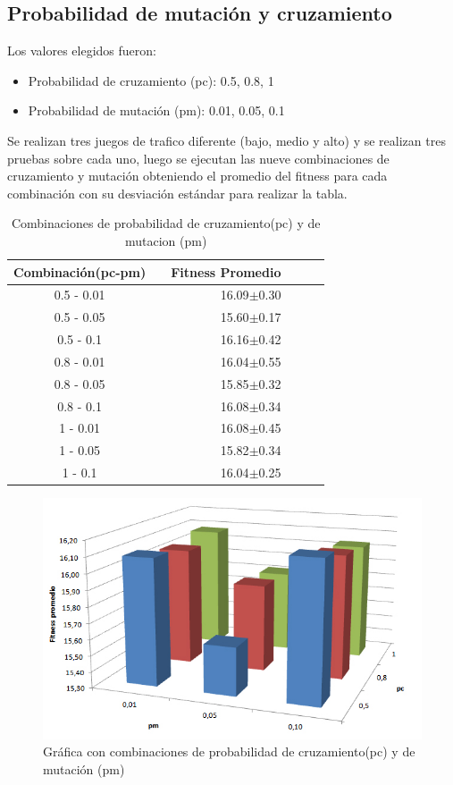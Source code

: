 \subsection{Probabilidad de mutación y cruzamiento}

Los valores elegidos fueron:

\begin{itemize}
	\item Probabilidad de cruzamiento (pc):  0.5, 0.8, 1
	\item Probabilidad de  mutación (pm):  0.01, 0.05, 0.1
\end{itemize}

Se realizan tres juegos de trafico diferente (bajo, medio y alto) y se realizan tres pruebas sobre cada uno, luego se ejecutan las nueve combinaciones de cruzamiento y mutación obteniendo el promedio del fitness para cada combinación con su desviación estándar para realizar la tabla.


\begin{table}[h]
	\renewcommand{\arraystretch}{1.2}
	\caption{Combinaciones de probabilidad de cruzamiento(pc) y de mutacion (pm)}
	\label{table:parametro_mutacion_cruzamiento}
	\centering
	\begin{tabular}{ccrrcr}
		\hline
		{\textbf{Combinación(pc-pm)}} & & 

		{\textbf{Fitness Promedio}} \\
		\hline
		0.5 - 0.01 & &  16.09$\pm$0.30\\
		0.5 - 0.05 & &  15.60$\pm$0.17\\
		0.5 - 0.1 & &  16.16$\pm$0.42\\
		0.8 - 0.01 & &  16.04$\pm$0.55\\
		0.8 - 0.05 & &  15.85$\pm$0.32\\
		0.8 - 0.1 & &  16.08$\pm$0.34\\
		1 - 0.01 & &  16.08$\pm$0.45\\
		1 - 0.05 & &  15.82$\pm$0.34\\
		1 - 0.1 & &  16.04$\pm$0.25\\
		\hline
	\end{tabular}
\end{table}


\begin{figure}[h]
	\centering
	\includegraphics[width=0.7\linewidth]{Figures/grafica_mutacion_cruzamiento}
	\caption{Gráfica con combinaciones de probabilidad de cruzamiento(pc) y de mutación (pm)}
	\label{fig:grafica_mutacion_cruzamiento}
\end{figure}

